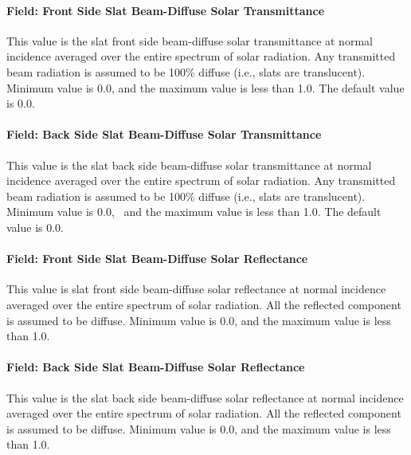 \paragraph{Field: Front Side Slat Beam-Diffuse Solar Transmittance}\label{field-front-side-slat-beam-diffuse-solar-transmittance}

This value is the slat front side beam-diffuse solar transmittance at normal incidence averaged over the entire spectrum of solar radiation. Any transmitted beam radiation is assumed to be 100\% diffuse (i.e., slats are translucent). Minimum value is 0.0, and the maximum value is less than 1.0. The default value is 0.0.

\paragraph{Field: Back Side Slat Beam-Diffuse Solar Transmittance}\label{field-back-side-slat-beam-diffuse-solar-transmittance}

This value is the slat back side beam-diffuse solar transmittance at normal incidence averaged over the entire spectrum of solar radiation. Any transmitted beam radiation is assumed to be 100\% diffuse (i.e., slats are translucent). Minimum value is 0.0,~ and the maximum value is less than 1.0. The default value is 0.0.

\paragraph{Field: Front Side Slat Beam-Diffuse Solar Reflectance}\label{field-front-side-slat-beam-diffuse-solar-reflectance}

This value is slat front side beam-diffuse solar reflectance at normal incidence averaged over the entire spectrum of solar radiation. All the reflected component is assumed to be diffuse. Minimum value is 0.0, and the maximum value is less than 1.0.

\paragraph{Field: Back Side Slat Beam-Diffuse Solar Reflectance}\label{field-back-side-slat-beam-diffuse-solar-reflectance}

This value is the slat back side beam-diffuse solar reflectance at normal incidence averaged over the entire spectrum of solar radiation. All the reflected component is assumed to be diffuse. Minimum value is 0.0, and the maximum value is less than 1.0.

